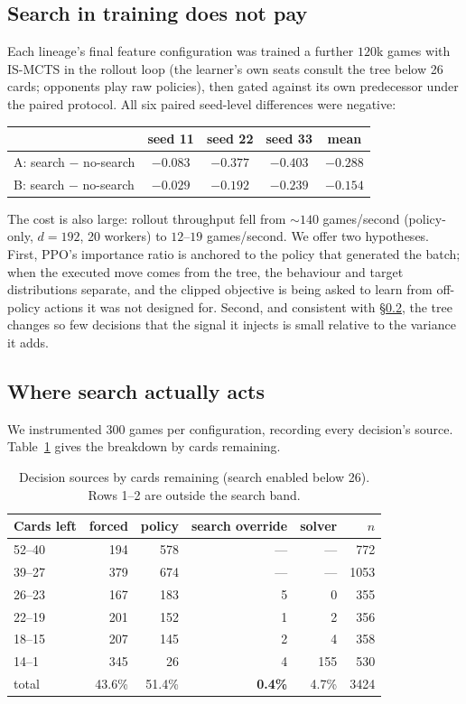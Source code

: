 \documentclass[11pt]{article}
\begin{document}
\subsection{Search in training does not pay}

Each lineage's final feature configuration was trained a further $120$k
games with IS-MCTS in the rollout loop (the learner's own seats
consult the tree below 26 cards; opponents play raw policies), then
gated against its own predecessor under the paired protocol. All six
paired seed-level differences were negative:

\begin{center}
\begin{tabular}{lccc c}
\toprule
& seed 11 & seed 22 & seed 33 & mean \\
\midrule
A: search $-$ no-search & $-0.083$ & $-0.377$ & $-0.403$ & $-0.288$ \\
B: search $-$ no-search & $-0.029$ & $-0.192$ & $-0.239$ & $-0.154$ \\
\bottomrule
\end{tabular}
\end{center}

The cost is also large: rollout throughput fell from $\sim 140$
games/second (policy-only, $d{=}192$, 20 workers) to $12$--$19$
games/second. We offer two hypotheses. First, PPO's importance ratio is
anchored to the policy that generated the batch; when the executed move
comes from the tree, the behaviour and target distributions separate,
and the clipped objective is being asked to learn from off-policy
actions it was not designed for. Second, and consistent with
\S\ref{sec:census}, the tree changes so few decisions that the signal
it injects is small relative to the variance it adds.

\subsection{Where search actually acts}
\label{sec:census}

We instrumented 300 games per configuration, recording every decision's
source. Table~\ref{tab:census} gives the breakdown by cards remaining.

\begin{table}[h]
\centering
\begin{tabular}{lrrrrr}
\toprule
Cards left & forced & policy & search override & solver & $n$ \\
\midrule
52--40 & 194 & 578 & --- & --- & 772 \\
39--27 & 379 & 674 & --- & --- & 1053 \\
26--23 & 167 & 183 & 5 & 0 & 355 \\
22--19 & 201 & 152 & 1 & 2 & 356 \\
18--15 & 207 & 145 & 2 & 4 & 358 \\
14--1 & 345 & 26 & 4 & 155 & 530 \\
\midrule
total & 43.6\% & 51.4\% & \textbf{0.4\%} & 4.7\% & 3424 \\
\bottomrule
\end{tabular}
\caption{Decision sources by cards remaining (search enabled below 26).
Rows 1--2 are outside the search band.}
\label{tab:census}
\end{table}
\end{document}
